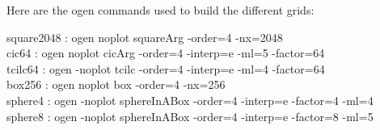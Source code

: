 Here are the ogen commands used to build the different grids:
\begin{flushleft}
 square2048 : ogen noplot squareArg -order=4 -nx=2048 \\
 cic64 : ogen noplot cicArg -order=4 -interp=e -ml=5 -factor=64 \\
 tcilc64 : ogen -noplot tcilc -order=4 -interp=e -ml=4 -factor=64 \\
 box256    : ogen noplot box -order=4 -nx=256 \\
 sphere4    : ogen -noplot sphereInABox -order=4 -interp=e -factor=4 -ml=4 \\
 sphere8    : ogen -noplot sphereInABox -order=4 -interp=e -factor=8 -ml=5
\end{flushleft}



